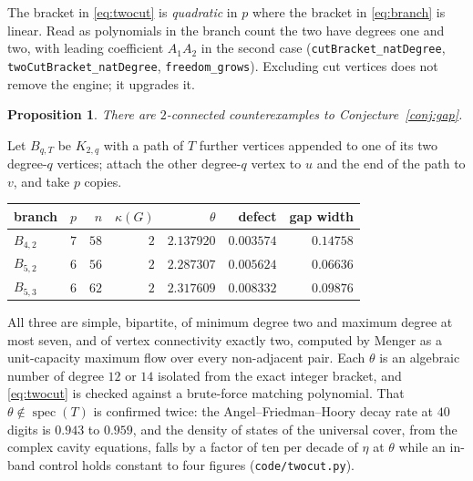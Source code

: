 \documentclass[11pt]{article}
\newtheorem{proposition}[theorem]{Proposition}
\theoremstyle{remark}
\begin{document}
The bracket in \eqref{eq:twocut} is \emph{quadratic} in $p$ where the bracket in
\eqref{eq:branch} is linear. Read as polynomials in the branch count the two have degrees one and
two, with leading coefficient $A_1A_2$ in the second case
(\texttt{cutBracket\_natDegree}, \texttt{twoCutBracket\_natDegree}, \texttt{freedom\_grows}).
Excluding cut vertices does not remove the engine; it upgrades it.

\begin{proposition}\label{prop:twoconn}
There are $2$-connected counterexamples to Conjecture~\ref{conj:gap}.
\end{proposition}

Let $B_{q,T}$ be $K_{2,q}$ with a path of $T$ further vertices appended to one of its two
degree-$q$ vertices; attach the other degree-$q$ vertex to $u$ and the end of the path to $v$,
and take $p$ copies.

\begin{center}
\begin{tabular}{lrrrrrr}
branch & $p$ & $n$ & $\kappa(G)$ & $\theta$ & defect & gap width\\\hline
$B_{4,2}$ & $7$ & $58$ & $2$ & $2.137920$ & $0.003574$ & $0.14758$\\
$B_{5,2}$ & $6$ & $56$ & $2$ & $2.287307$ & $0.005624$ & $0.06636$\\
$B_{5,3}$ & $6$ & $62$ & $2$ & $2.317609$ & $0.008332$ & $0.09876$\\
\end{tabular}
\end{center}

All three are simple, bipartite, of minimum degree two and maximum degree at most seven, and of
vertex connectivity exactly two, computed by Menger as a unit-capacity maximum flow over every
non-adjacent pair. Each $\theta$ is an algebraic number of degree $12$ or $14$ isolated from the
exact integer bracket, and \eqref{eq:twocut} is checked against a brute-force matching
polynomial. That $\theta\notin\operatorname{spec}(T)$ is confirmed twice: the
Angel--Friedman--Hoory decay rate at $40$ digits is $0.943$ to $0.959$, and the density of states
of the universal cover, from the complex cavity equations, falls by a factor of ten per decade of
$\eta$ at $\theta$ while an in-band control holds constant to four figures
(\texttt{code/twocut.py}).
\end{document}
